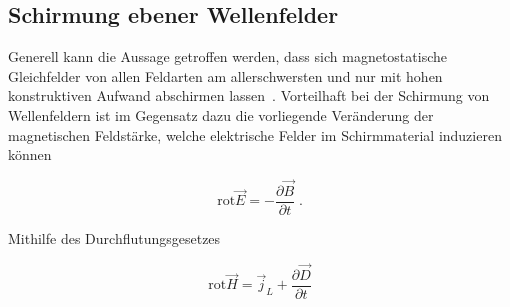 \subsection{Schirmung ebener Wellenfelder}\label{cha:2_sub_Schirmung_ebener_Wellenfelder}

Generell kann die Aussage getroffen werden, dass sich magnetostatische Gleichfelder von allen Feldarten am allerschwersten und nur mit hohen konstruktiven Aufwand abschirmen lassen~\cite{EM_Schirmung}. Vorteilhaft bei der Schirmung von Wellenfeldern ist im Gegensatz dazu die vorliegende Veränderung der magnetischen Feldstärke, welche elektrische Felder im Schirmmaterial induzieren können~\cite{Maxwell}


\begin{equation}
    \text{rot} \vec E= - \frac{\partial \vec B}{\partial t} \; \text{.}
    \label{eq:2_Induktionsgesetz}
\end{equation}

Mithilfe des Durchflutungsgesetzes~\cite{Maxwell}

\begin{equation}
    \text{rot} \vec H = \vec j_L + \frac{\partial \vec D}{\partial t}
    \label{eq:2_Durchflutungsgesetz}
\end{equation}

